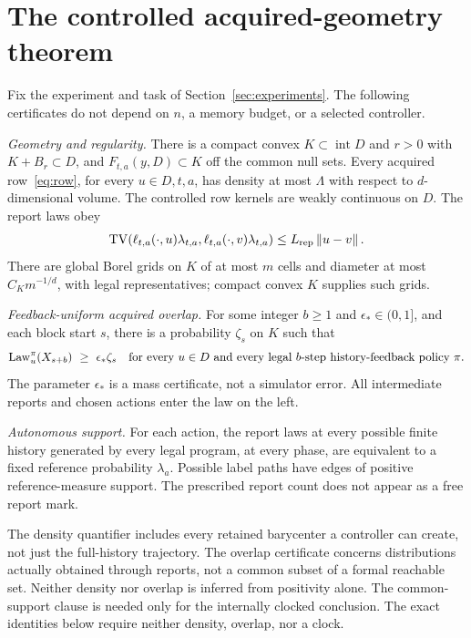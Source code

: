 \section{The controlled acquired-geometry theorem}\label{sec:main}
\begin{definition}\label{def:class}
Fix the experiment and task of Section~\ref{sec:experiments}. The following certificates do not depend on $n$, a memory budget, or a selected controller.

\emph{Geometry and regularity.} There is a compact convex $K\subset\operatorname{int}D$ and $r>0$ with $K+B_r\subset D$, and $F_{t,a}(y,D)\subset K$ off the common null sets. Every acquired row~\eqref{eq:row}, for every $u\in D,t,a$, has density at most $\Lambda$ with respect to $d$-dimensional volume. The controlled row kernels are weakly continuous on $D$. The report laws obey
\[
 \operatorname{TV}(\ell_{t,a}(\cdot,u)\lambda_{t,a},
       \ell_{t,a}(\cdot,v)\lambda_{t,a})\le L_{\rm rep}\left\lVert u-v\right\rVert.
\]
There are global Borel grids on $K$ of at most $m$ cells and diameter at most $C_Km^{-1/d}$, with legal representatives; compact convex $K$ supplies such grids.

\emph{Feedback-uniform acquired overlap.} For some integer $b\ge1$ and $\epsilon_*\in(0,1]$, and each block start $s$, there is a probability $\zeta_s$ on $K$ such that
\begin{equation}\label{eq:overlap}
 \operatorname{Law}_u^\pi(X_{s+b})\ \ge\ \epsilon_*\zeta_s
 \quad\text{for every }u\in D
 \text{ and every legal $b$-step history-feedback policy }\pi.
\end{equation}
The parameter $\epsilon_*$ is a mass certificate, not a simulator error. All intermediate reports and chosen actions enter the law on the left.

\emph{Autonomous support.} For each action, the report laws at every possible finite history generated by every legal program, at every phase, are equivalent to a fixed reference probability $\lambda_a$. Possible label paths have edges of positive reference-measure support. The prescribed report count does not appear as a free report mark.
\end{definition}

The density quantifier includes every retained barycenter a controller can create, not just the full-history trajectory. The overlap certificate concerns distributions actually obtained through reports, not a common subset of a formal reachable set. Neither density nor overlap is inferred from positivity alone. The common-support clause is needed only for the internally clocked conclusion. The exact identities below require neither density, overlap, nor a clock.

